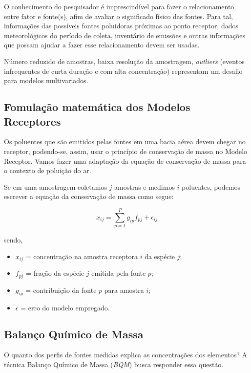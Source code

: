 O conhecimento do pesquisador é imprescindível para fazer o relacionamento 
entre fator e fonte(s), afim de avaliar o significado físico das fontes. 
Para tal, informações das possíveis fontes poluidoras próximas ao ponto 
receptor, dados meteorológicos do período de coleta, inventário de emissões 
e outras informações que possam ajudar a fazer esse relacionamento 
devem ser usadas.

Número reduzido de amostras, baixa resolução da amostragem, \textit{outliers} 
(eventos infrequentes de curta duração e com alta concentração) representam 
um desafio para modelos multivariados.

\subsection{Fomulação matemática dos Modelos Receptores}

Os poluentes que são emitidos pelas fontes em uma bacia aérea devem chegar no 
receptor, podendo-se, assim, usar o princípio de conservação de massa no Modelo Receptor. 
Vamos fazer uma adaptação da equação de conservação de massa para o contexto 
de poluição do ar. 

Se em uma amostragem coletamos $j$ amostras e medimos $i$ poluentes, podemos 
escrever a equação da conservação de massa como segue: 

\begin{equation}
  x_{ij} = \sum_{p=1}^{P} g_{ip}f_{pj} + \epsilon_{ij}
\end{equation} 

sendo,
\begin{itemize}
  \item $x_{ij}$ = concentração na amostra receptora $i$ da espécie $j$;
  \item $f_{pj}$ = fração da espécie $j$ emitida pela fonte $p$;
  \item $g_{ip}$ = contribuição da fonte $p$ para amostra $i$;
  \item $\epsilon$ = erro do modelo empregado.
\end{itemize}

\subsection{Balanço Químico de Massa}

O quanto dos perfis de fontes medidas explica as concentrações dos elementos? 
A técnica Balanço Químico de Massa (\textit{BQM}) busca responder essa questão.

